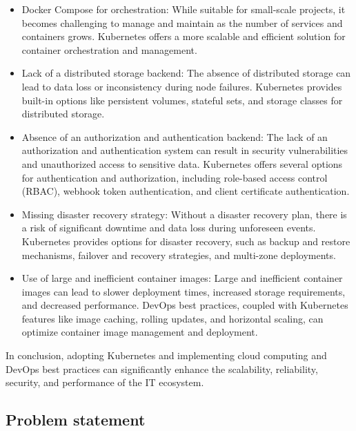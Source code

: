 \begin{itemize}[label={--}]

\item Docker Compose for orchestration: While suitable for small-scale projects, it becomes challenging to manage and maintain as the number of services and containers grows. Kubernetes offers a more scalable and efficient solution for container orchestration and management. 

\item Lack of a distributed storage backend: The absence of distributed storage can lead to data loss or inconsistency during node failures. Kubernetes provides built-in options like persistent volumes, stateful sets, and storage classes for distributed storage. 

\item Absence of an authorization and authentication backend: The lack of an authorization and authentication system can result in security vulnerabilities and unauthorized access to sensitive data. Kubernetes offers several options for authentication and authorization, including role-based access control (RBAC), webhook token authentication, and client certificate authentication. 

\item Missing disaster recovery strategy: Without a disaster recovery plan, there is a risk of significant downtime and data loss during unforeseen events. Kubernetes provides options for disaster recovery, such as backup and restore mechanisms, failover and recovery strategies, and multi-zone deployments. 

\item Use of large and inefficient container images: Large and inefficient container images can lead to slower deployment times, increased storage requirements, and decreased performance. DevOps best practices, coupled with Kubernetes features like image caching, rolling updates, and horizontal scaling, can optimize container image management and deployment. 

\end{itemize}

In conclusion, adopting Kubernetes and implementing cloud computing and DevOps best practices can significantly enhance the scalability, reliability, security, and performance of the IT ecosystem. 

\subsection{Problem statement }

